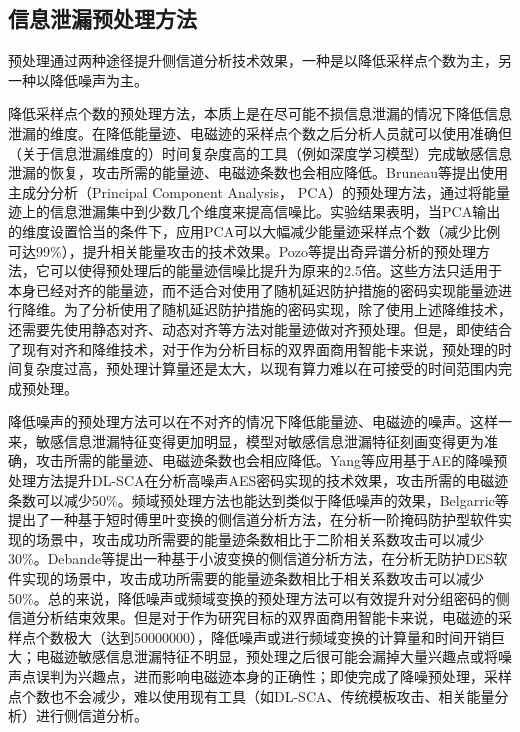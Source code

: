 {	\subsection{信息泄漏预处理方法}
	预处理通过两种途径提升侧信道分析技术效果，一种是以降低采样点个数为主，另一种以降低噪声为主。
	
	降低采样点个数的预处理方法，本质上是在尽可能不损信息泄漏的情况下降低信息泄漏的维度。在降低能量迹、电磁迹的采样点个数之后分析人员就可以使用准确但（关于信息泄漏维度的）时间复杂度高的工具（例如深度学习模型）完成敏感信息泄漏的恢复，攻击所需的能量迹、电磁迹条数也会相应降低。Bruneau等\citep{bruneau:hal-01218072}提出使用主成分分析（Principal Component Analysis， PCA）的预处理方法，通过将能量迹上的信息泄漏集中到少数几个维度来提高信噪比。实验结果表明，当PCA输出的维度设置恰当的条件下，应用PCA可以大幅减少能量迹采样点个数（减少比例可达99\%），提升相关能量攻击的技术效果。Pozo等\citep{Pozo15}提出奇异谱分析的预处理方法，它可以使得预处理后的能量迹信噪比提升为原来的2.5倍。这些方法只适用于本身已经对齐的能量迹，而不适合对使用了随机延迟防护措施的密码实现能量迹进行降维。为了分析使用了随机延迟防护措施的密码实现，除了使用上述降维技术，还需要先使用静态对齐\citep{Homma08}、动态对齐\citep{Woudenberg11}等方法对能量迹做对齐预处理。但是，即使结合了现有对齐和降维技术，对于作为分析目标的双界面商用智能卡来说，预处理的时间复杂度过高，预处理计算量还是太大，以现有算力难以在可接受的时间范围内完成预处理。
	
	降低噪声的预处理方法可以在不对齐的情况下降低能量迹、电磁迹的噪声。这样一来，敏感信息泄漏特征变得更加明显，模型对敏感信息泄漏特征刻画变得更为准确，攻击所需的能量迹、电磁迹条数也会相应降低。Yang等\citep{Yang19}应用基于AE的降噪预处理方法提升DL-SCA在分析高噪声AES密码实现的技术效果，攻击所需的电磁迹条数可以减少50\%。频域预处理方法也能达到类似于降低噪声的效果，Belgarric等\citep{Belgarric16}提出了一种基于短时傅里叶变换的侧信道分析方法，在分析一阶掩码防护型软件实现的场景中，攻击成功所需要的能量迹条数相比于二阶相关系数攻击可以减少30\%。Debande等\citep{Debande12}提出一种基于小波变换的侧信道分析方法，在分析无防护DES软件实现的场景中，攻击成功所需要的能量迹条数相比于相关系数攻击可以减少50\%。总的来说，降低噪声或频域变换的预处理方法可以有效提升对分组密码的侧信道分析结束效果。但是对于作为研究目标的双界面商用智能卡来说，电磁迹的采样点个数极大（达到50000000），降低噪声或进行频域变换的计算量和时间开销巨大；电磁迹敏感信息泄漏特征不明显，预处理之后很可能会漏掉大量兴趣点或将噪声点误判为兴趣点，进而影响电磁迹本身的正确性；即使完成了降噪预处理，采样点个数也不会减少，难以使用现有工具（如DL-SCA、传统模板攻击、相关能量分析）进行侧信道分析。
	
}

